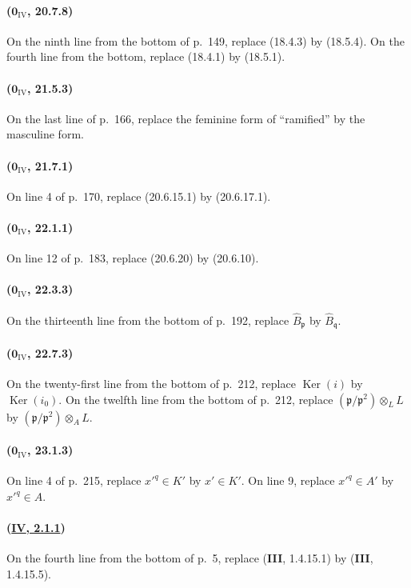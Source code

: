 \paragraph{($\mathbf{0}_{\mathrm{IV}}$, 20.7.8)}
On the ninth line from the bottom of p.~149, replace (18.4.3) by
(18.5.4).  On the fourth line from the bottom, replace (18.4.1) by
(18.5.1).

\paragraph{($\mathbf{0}_{\mathrm{IV}}$, 21.5.3)}
On the last line of p.~166, replace the feminine form of ``ramified'' by
the masculine form.

\paragraph{($\mathbf{0}_{\mathrm{IV}}$, 21.7.1)}
On line 4 of p.~170, replace (20.6.15.1) by (20.6.17.1).

\paragraph{($\mathbf{0}_{\mathrm{IV}}$, 22.1.1)}
On line 12 of p.~183, replace (20.6.20) by (20.6.10).

\paragraph{($\mathbf{0}_{\mathrm{IV}}$, 22.3.3)}
On the thirteenth line from the bottom of p.~192, replace
$\widehat B_{\mathfrak p}$ by $\widehat B_{\mathfrak q}$.

\paragraph{($\mathbf{0}_{\mathrm{IV}}$, 22.7.3)}
On the twenty-first line from the bottom of p.~212, replace
$\operatorname{Ker}(i)$ by $\operatorname{Ker}(i_0)$.  On the twelfth
line from the bottom of p.~212, replace
$(\mathfrak p/\mathfrak p^2)\otimes_L L$ by
$(\mathfrak p/\mathfrak p^2)\otimes_A L$.

\paragraph{($\mathbf{0}_{\mathrm{IV}}$, 23.1.3)}
On line 4 of p.~215, replace $x'^q\in K'$ by $x'\in K'$.  On line 9,
replace $x'^q\in A'$ by $x'^q\in A$.

\paragraph{({\texorpdfstring{\protect\hyperref[IV.2.1.1]{\textbf{IV}, 2.1.1}}{IV, 2.1.1}})}
On the fourth line from the bottom of p.~5, replace (\textbf{III}, 1.4.15.1) by
(\textbf{III}, 1.4.15.5).

